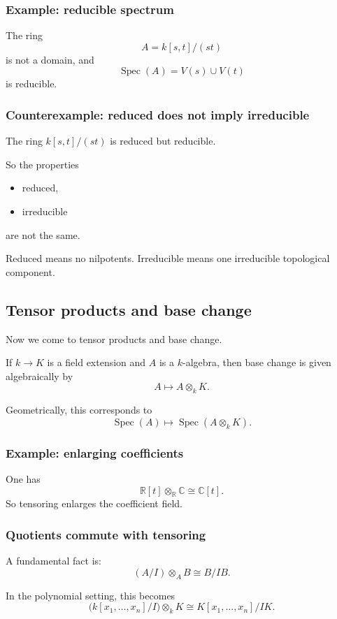 \documentclass[12pt,a4paper]{article}
\theoremstyle{notespace}
\newcommand{\Spec}{\operatorname{Spec}}
\theoremstyle{definition}
\begin{document}
\subsubsection{Example: reducible spectrum}

The ring
\[
A=k[s,t]/(st)
\]
is not a domain, and
\[
\Spec(A)=V(s)\cup V(t)
\]
is reducible.

\subsubsection{Counterexample: reduced does not imply irreducible}

The ring \(k[s,t]/(st)\) is reduced but reducible.

So the properties
\begin{itemize}
	\item reduced,
	\item irreducible
\end{itemize}
are not the same.

Reduced means no nilpotents.  
Irreducible means one irreducible topological component.

\subsection{Tensor products and base change}

Now we come to tensor products and base change.

If \(k\to K\) is a field extension and \(A\) is a \(k\)-algebra, then base change is given algebraically by
\[
A \longmapsto A\otimes_k K.
\]

Geometrically, this corresponds to
\[
\Spec(A)\longmapsto \Spec(A\otimes_k K).
\]

\subsubsection{Example: enlarging coefficients}

One has
\[
\mathbb R[t]\otimes_{\mathbb R}\mathbb C\cong \mathbb C[t].
\]
So tensoring enlarges the coefficient field.

\subsubsection{Quotients commute with tensoring}

A fundamental fact is:
\[
(A/I)\otimes_A B\cong B/IB.
\]

In the polynomial setting, this becomes
\[
\bigl(k[x_1,\dots,x_n]/I\bigr)\otimes_k K
\cong
K[x_1,\dots,x_n]/IK.
\]
\end{document}
